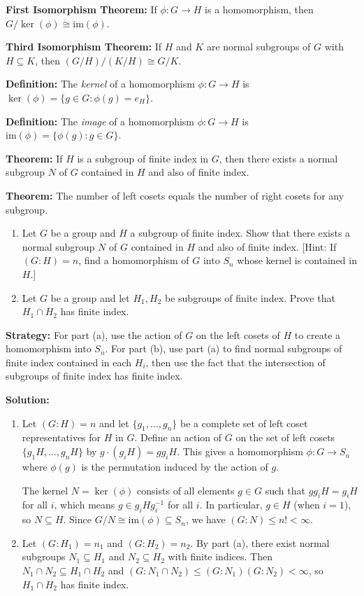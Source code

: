 \textbf{First Isomorphism Theorem:} If $\phi: G \to H$ is a homomorphism, then $G/\ker(\phi) \cong \text{im}(\phi)$.

\textbf{Third Isomorphism Theorem:} If $H$ and $K$ are normal subgroups of $G$ with $H \subseteq K$, then $(G/H)/(K/H) \cong G/K$.

\textbf{Definition:} The \textit{kernel} of a homomorphism $\phi: G \to H$ is $\ker(\phi) = \{g \in G : \phi(g) = e_H\}$.

\textbf{Definition:} The \textit{image} of a homomorphism $\phi: G \to H$ is $\text{im}(\phi) = \{\phi(g) : g \in G\}$.

\textbf{Theorem:} If $H$ is a subgroup of finite index in $G$, then there exists a normal subgroup $N$ of $G$ contained in $H$ and also of finite index.

\textbf{Theorem:} The number of left cosets equals the number of right cosets for any subgroup.

\begin{problembox}
\begin{enumerate}[label=(\alph*)]
\item Let $G$ be a group and $H$ a subgroup of finite index. Show that there exists a normal subgroup $N$ of $G$ contained in $H$ and also of finite index. [Hint: If $(G : H) = n$, find a homomorphism of $G$ into $S_n$ whose kernel is contained in $H$.]
\item Let $G$ be a group and let $H_1, H_2$ be subgroups of finite index. Prove that $H_1 \cap H_2$ has finite index.
\end{enumerate}
\end{problembox}

\noindent\textbf{Strategy:} For part (a), use the action of $G$ on the left cosets of $H$ to create a homomorphism into $S_n$. For part (b), use part (a) to find normal subgroups of finite index contained in each $H_i$, then use the fact that the intersection of subgroups of finite index has finite index.

\noindent\textbf{Solution:}
\begin{enumerate}[label=(\alph*)]
\item Let $(G : H) = n$ and let $\{g_1, \ldots, g_n\}$ be a complete set of left coset representatives for $H$ in $G$. Define an action of $G$ on the set of left cosets $\{g_1H, \ldots, g_nH\}$ by $g \cdot (g_iH) = gg_iH$. This gives a homomorphism $\phi: G \to S_n$ where $\phi(g)$ is the permutation induced by the action of $g$.

The kernel $N = \ker(\phi)$ consists of all elements $g \in G$ such that $gg_iH = g_iH$ for all $i$, which means $g \in g_iHg_i^{-1}$ for all $i$. In particular, $g \in H$ (when $i = 1$), so $N \subseteq H$. Since $G/N \cong \text{im}(\phi) \subseteq S_n$, we have $(G : N) \leq n! < \infty$.

\item Let $(G : H_1) = n_1$ and $(G : H_2) = n_2$. By part (a), there exist normal subgroups $N_1 \subseteq H_1$ and $N_2 \subseteq H_2$ with finite indices. Then $N_1 \cap N_2 \subseteq H_1 \cap H_2$ and $(G : N_1 \cap N_2) \leq (G : N_1)(G : N_2) < \infty$, so $H_1 \cap H_2$ has finite index.
\end{enumerate}


